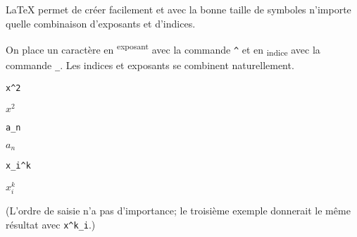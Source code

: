 {\LaTeX} permet de créer facilement et avec la bonne taille de
symboles n'importe quelle combinaison d'exposants et d'indices.

On place un caractère en \textsuperscript{exposant} avec la
commande \verb=^= et en \textsubscript{indice} avec la commande
\verb=_=. Les indices et exposants se combinent naturellement.
\begin{demo}
  \def\strut{\rule[-0.4ex]{0pt}{2ex}}
  \begin{minipage}{0.3\linewidth}
    \begin{texample}[0.6\linewidth]
\begin{lstlisting}
x^2
\end{lstlisting}
      \producing\strut $x^2$
    \end{texample}
  \end{minipage}
  \quad
  \begin{minipage}{0.3\linewidth}
    \begin{texample}[0.6\linewidth]
\begin{lstlisting}
a_n
\end{lstlisting}
      \producing\strut $a_n$
    \end{texample}
  \end{minipage}
  \quad
  \begin{minipage}{0.3\linewidth}
    \begin{texample}[0.63\linewidth]
\begin{lstlisting}
x_i^k
\end{lstlisting}
      \producing\strut $x_i^k$
    \end{texample}
  \end{minipage}
\end{demo}
(L'ordre de saisie n'a pas d'importance; le troisième exemple
donnerait le même résultat avec \verb=x^k_i=.)


